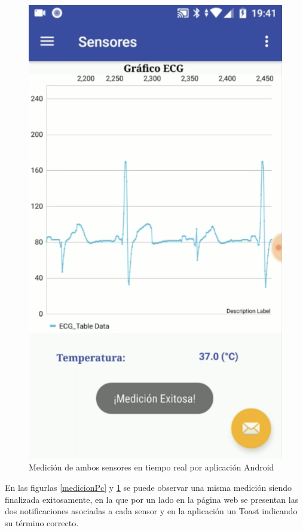 \begin{figure}[H]
	\centering
	\includegraphics[scale=0.4]{figuras/protof/medicionApp.png}
	\caption{Medición de ambos sensores en tiempo real por aplicación Android}
	\label{medicionApp}
\end{figure}

En las figurlas \ref{medicionPc} y \ref{medicionApp} se puede observar una misma medición siendo finalizada exitosamente, en la que por un lado en la página web se presentan las dos notificaciones asociadas a cada sensor y en la aplicación un Toast indicando su término correcto.

